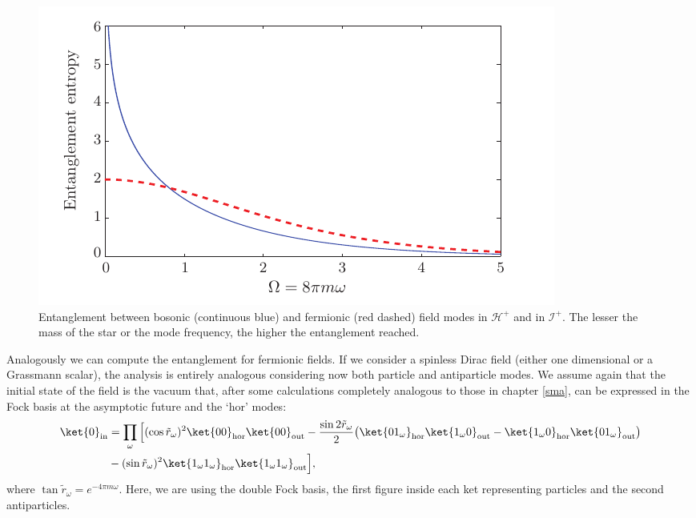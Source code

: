 \begin{figure}[h]
\begin{center}
\includegraphics[width=.90\columnwidth,height=.5\columnwidth]{figboth}
\end{center}
\caption{Entanglement between bosonic (continuous blue) and fermionic (red dashed)
field modes in $\mathscr{H}^+$ and in $\mathscr{I}^+$.
The lesser the mass of the star or the mode frequency, the higher the
entanglement reached.}
\label{fig2}
\end{figure}
Analogously we can compute the entanglement for fermionic
fields. If we consider a spinless Dirac field (either one dimensional or a
Grassmann scalar), the analysis is entirely analogous considering
now both particle and antiparticle modes. We assume again that the
initial state of the field is the vacuum that, after some 
calculations completely analogous to those in chapter \ref{sma}, can be expressed in the Fock basis at the asymptotic
future and the `hor' modes:
\begin{align}\label{squef}
\ket{0}_\text{in}&=\prod_{\omega}\Big[(\cos\tilde r_{\omega})^2
\ket{00}_\text{hor}\ket{00}_{\text{out}}-\frac{\sin 2\tilde r_{\omega}}{2}
\big(\ket{01_\omega}_\text{hor}\ket{1_\omega0}_{\text{out}}
 - \ket{1_\omega0}_\text{hor}
 \ket{01_\omega}_{\text{out}}\big)
 \nonumber\\
 &-(\sin\tilde r_{\omega})^2
 \ket{1_\omega1_\omega}_\text{hor}
 \ket{1_\omega1_\omega}_{\text{out}}\Big],
\end{align}
where  $\tan \tilde r_\omega= e^{-4\pi m\omega} $. Here, we are using
the double Fock basis, the first figure inside each ket representing
particles and the second  antiparticles.

